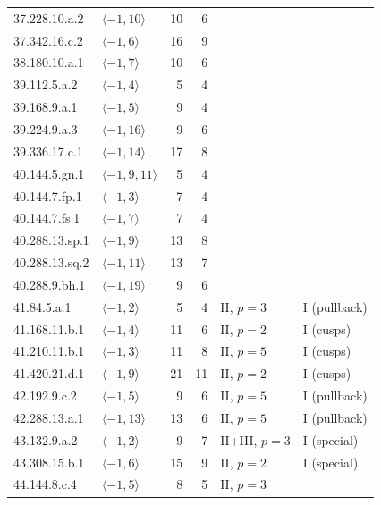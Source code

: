 \begin{longtable}{llrrll}
37.228.10.a.2 & $\langle -1,10\rangle$ & 10 & 6 & \cite{Orlic2025} & \cite{Orlic2025}\\
37.342.16.c.2 & $\langle -1,6\rangle$ & 16 & 9 & \cite{Orlic2025} & \cite{Orlic2025}\\
38.180.10.a.1 & $\langle -1,7\rangle$ & 10 & 6 & \cite{Orlic2025} & \cite{Orlic2025}\\
39.112.5.a.2 & $\langle -1,4\rangle$ & 5 & 4 & \cite{Orlic2025} & \cite{Orlic2025}\\
39.168.9.a.1 & $\langle -1,5\rangle$ & 9 & 4 & \cite{Orlic2025} & \cite{Orlic2025}\\
39.224.9.a.3 & $\langle -1,16\rangle$ & 9 & 6 & \cite{Orlic2025} & \cite{Orlic2025}\\
39.336.17.c.1 & $\langle -1,14\rangle$ & 17 & 8 & \cite{Orlic2025} & \cite{Orlic2025}\\
40.144.5.gn.1 & $\langle -1,9,11\rangle$ & 5 & 4 & \cite{Orlic2025} & \cite{Orlic2025}\\
40.144.7.fp.1 & $\langle -1,3\rangle$ & 7 & 4 & \cite{Orlic2025} & \cite{Orlic2025}\\
40.144.7.fs.1 & $\langle -1,7\rangle$ & 7 & 4 & \cite{Orlic2025} & \cite{Orlic2025}\\
40.288.13.sp.1 & $\langle -1,9\rangle$ & 13 & 8 & \cite{Orlic2025} & \cite{Orlic2025}\\
40.288.13.sq.2 & $\langle -1,11\rangle$ & 13 & 7 & \cite{Orlic2025} & \cite{Orlic2025}\\
40.288.9.bh.1 & $\langle -1,19\rangle$ & 9 & 6 & \cite{Orlic2025} & \cite{Orlic2025}\\
41.84.5.a.1 & $\langle -1,2\rangle$ & 5 & 4 & II, $p=3$ & I (pullback)\\
41.168.11.b.1 & $\langle -1,4\rangle$ & 11 & 6 & II, $p=2$ & I (cusps)\\
41.210.11.b.1 & $\langle -1,3\rangle$ & 11 & 8 & II, $p=5$ & I (cusps)\\
41.420.21.d.1 & $\langle -1,9\rangle$ & 21 & 11 & II, $p=2$ & I (cusps)\\
42.192.9.c.2 & $\langle -1,5\rangle$ & 9 & 6 & II, $p=5$ & I (pullback)\\
42.288.13.a.1 & $\langle -1,13\rangle$ & 13 & 6 & II, $p=5$ & I (pullback)\\
43.132.9.a.2 & $\langle -1,2\rangle$ & 9 & 7 & II+III, $p=3$ & I (special)\\
43.308.15.b.1 & $\langle -1,6\rangle$ & 15 & 9 & II, $p=2$ & I (special)\\
44.144.8.c.4 & $\langle -1,5\rangle$ & 8 & 5 & II, $p=3$ & \cite{Orlic2025}\\

\end{longtable}
